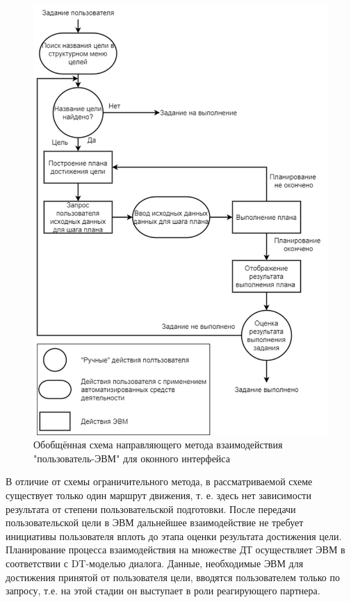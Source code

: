 \begin{figure}[!ht]
  \centering
  \includegraphics[scale=0.35]{ResearchNotes/rndhpc_not_gui_2022_10_10/scheme2.png}
  \caption{Обобщённая схема направляющего метода взаимодействия "пользователь-ЭВМ" для оконного интерфейса}
  \label{scheme2}
\end{figure}

	В отличие от схемы ограничительного метода, в рассматриваемой схеме существует только один маршрут движения, т. е. здесь нет зависимости результата от степени пользовательской подготовки. После передачи пользовательской цели в ЭВМ дальнейшее взаимодействие не требует инициативы пользователя вплоть до этапа оценки результата достижения цели. Планирование процесса взаимодействия на множестве ДТ осуществляет ЭВМ в соответствии с DT-моделью диалога. Данные, необходимые ЭВМ для достижения принятой от пользователя цели, вводятся пользователем только по запросу, т.е. на этой стадии он выступает в роли реагирующего партнера.

